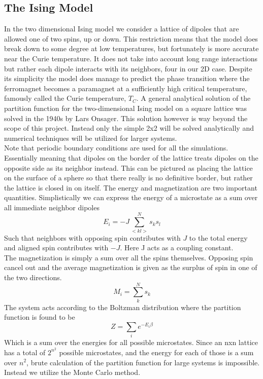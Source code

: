 \documentclass[a4paper, 12pt]{article}
\begin{document}
{\subsection{The Ising Model}
	In the two dimensional Ising model we consider a lattice of dipoles that are allowed one of two spins, up or down. This restriction means that the model does break down to some degree at low temperatures, but fortunately is more accurate near the Curie temperature.\cite[p.~340]{schroeder} It does not take into account long range interactions but rather each dipole interacts with its neighbors, four in our 2D case. Despite its simplicity the model does manage to predict the phase transition where the ferromagnet becomes a paramagnet at a sufficiently high critical temperature, famously called the Curie temperature, $T_C$. A general analytical solution of the partition function for the two-dimensional Ising model on a square lattice was solved in the 1940s by Lars Onsager\cite[p.~343]{schroeder}. This solution however is way beyond the scope of this project. Instead only the simple 2x2 will be solved analytically and numerical techniques will be utilized for larger systems.\\
	Note that periodic boundary conditions are used for all the simulations. Essentially meaning that dipoles on the border of the lattice treats dipoles on the opposite side as its neighbor instead. This can be pictured as placing the lattice on the surface of a sphere so that there really is no definitive border, but rather the lattice is closed in on itself. 
	The energy and magnetization are two important quantities. Simplistically we can express the energy of a microstate as a sum over all immediate neighbor dipoles
	\begin{equation}\label{eq:energy}
		E_i = -J\sum_{<kl>}^N s_k s_l
	\end{equation}
	Such that neighbors with opposing spin contributes with $J$ to the total energy and aligned spin contributes with $-J$. Here J acts as a coupling constant.\\
	The magnetization is simply a sum over all the spins themselves. Opposing spin cancel out and the average magnetization is given as the surplus of spin in one of the two directions.
	\begin{equation}
		M_i = \sum_k^N s_k
	\end{equation}
	The system acts according to the Boltzman distribution where the partition function is found to be
	\begin{equation}
		Z = \sum_ie^{-E_i\beta}
	\end{equation}
	Which is a sum over the energies for all possible microstates. Since an nxn lattice has a total of $2^{n^2}$ possible microstates, and the  energy for each of those is a sum over $n^2$, brute calculation of the partition function for large systems is impossible. Instead we utilize the Monte Carlo method.
}
\end{document}
